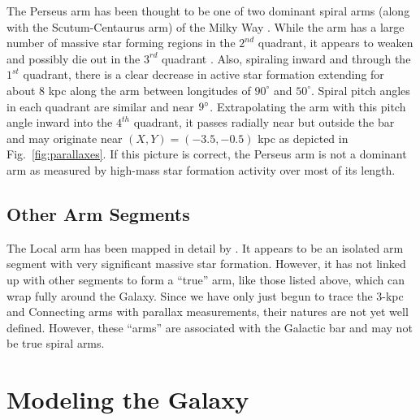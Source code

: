 \documentclass[12pt,preprint]{aastex}
\def\deg  {\ifmmode {^\circ}\else {$^\circ$}\fi}
\begin{document}
The Perseus arm has been thought to be one of two dominant spiral arms 
(along with the Scutum-Centaurus arm) of the Milky Way \citep{Drimmel:00,Churchwell:09}.  
While the arm has a large number of massive star forming regions in the $2^{nd}$ quadrant, 
it appears to weaken and possibly die out in the $3^{rd}$ quadrant \citep{Koo:17}.  
Also, spiraling inward and through the $1^{st}$ quadrant, there is a clear decrease 
in active star formation \citep{Zhang:13,Zhang18} extending for about 8 kpc along 
the arm between longitudes of $90^\circ$ and $50^\circ$.  
Spiral pitch angles in each quadrant are similar and near $9\deg$.  
Extrapolating the arm with this pitch angle inward into the $4^{th}$ quadrant, 
it passes radially near but outside the bar and may originate near 
$(X,Y)=(-3.5,-0.5)$ kpc as depicted in Fig.~\ref{fig:parallaxes}.  
If this picture is correct, the Perseus arm is not a dominant arm as measured
by high-mass star formation activity over most of its length.  

\subsection{Other Arm Segments}

The Local arm has been mapped in detail by \citet{Xu:13,Xu:16}.  It appears
to be an isolated arm segment with very significant massive star formation.
However, it has not linked up with other segments to form a ``true'' arm,
like those listed above, which can wrap fully around the Galaxy.  Since we 
have only just begun to trace the 3-kpc and Connecting arms with parallax
measurements, their natures are not yet well defined.  However, these ``arms''
are associated with the Galactic bar and may not be true spiral arms.
 
  

\section{Modeling the Galaxy} \label{sect:modeling}
\end{document}
